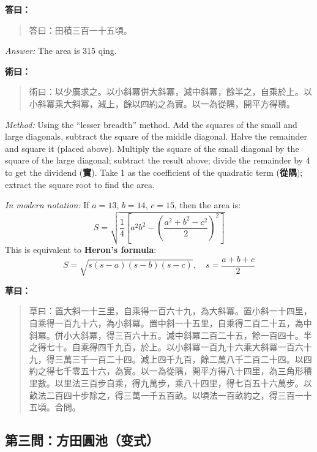\documentclass[11pt,a4paper]{article}
\newenvironment{answer}{%
  \medskip\noindent{\color{answercolor}\rule{0.5\textwidth}{0.5pt}}%
  \par\color{answercolor}%
}{%
  \par\medskip%
}
\newenvironment{method}{%
  \medskip\noindent{\color{methodcolor}\rule{0.5\textwidth}{0.5pt}}%
  \par\color{methodcolor}%
}{%
  \par\medskip%
}
\begin{document}
\begin{answer}
\textbf{答曰：}

\begin{quote}
\textcolor{chinacolor}{%
答曰：田積三百一十五頃。
}
\end{quote}

\textit{Answer:} The area is 315 qing.
\end{answer}

\begin{method}
\textbf{術曰：}

\begin{quote}
\textcolor{chinacolor}{%
術曰：以少廣求之。以小斜冪併大斜冪，減中斜冪，餘半之，自乘於上。以小斜冪乘大斜冪，減上，餘以四約之為實。以一為從隅，開平方得積。
}
\end{quote}

\textit{Method:} Using the ``lesser breadth'' method. Add the squares of 
the small and large diagonals, subtract the square of the middle diagonal. 
Halve the remainder and square it (placed above). Multiply the square of 
the small diagonal by the square of the large diagonal; subtract the result 
above; divide the remainder by 4 to get the dividend (\textbf{實}). Take 1 as the 
coefficient of the quadratic term (\textbf{從隅}); extract the square root to find the area.

\medskip
\textit{In modern notation:} If $a=13$, $b=14$, $c=15$, then the area is:
\[
S = \sqrt{\frac{1}{4}\left[a^2b^2 - \left(\frac{a^2+b^2-c^2}{2}\right)^2\right]}
\]
This is equivalent to \textbf{Heron's formula}:
\[
S = \sqrt{s(s-a)(s-b)(s-c)}, \quad s = \frac{a+b+c}{2}
\]
\end{method}

\noindent\textbf{\color{notecolor}草曰：}
\begin{quote}
\textcolor{chinacolor}{%
草曰：置大斜一十三里，自乘得一百六十九，為大斜冪。置小斜一十四里，自乘得一百九十六，為小斜冪。置中斜一十五里，自乘得二百二十五，為中斜冪。併小大斜冪，得三百六十五。減中斜冪二百二十五，餘一百四十。半之得七十。自乘得四千九百，於上。以小斜冪一百九十六乘大斜冪一百六十九，得三萬三千一百二十四。減上四千九百，餘二萬八千二百二十四。以四約之得七千零五十六，為實。以一為從隅，開平方得八十四里，為三角形積里數。以里法三百步自乘，得九萬步，乘八十四里，得七百五十六萬步。以畝法二百四十步除之，得三萬一千五百畝。以頃法一百畝約之，得三百一十五頃。合問。
}
\end{quote}

\subsection*{第三問：方田圓池（变式）}
\end{document}
